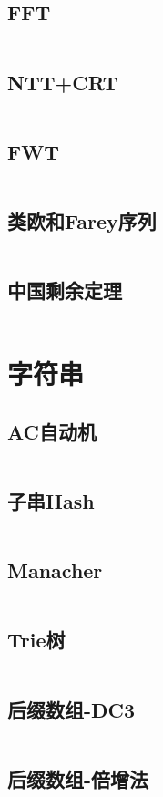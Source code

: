 \documentclass[UTF8]{ctexart}
\begin{document}
\subsection{FFT}
\inputminted{cpp}{math/FFT.cpp}
\subsection{NTT+CRT}
\inputminted{cpp}{math/NTT+CRT.cpp}
\subsection{FWT}
\inputminted{cpp}{math/FWT.cpp}
\subsection{类欧和Farey序列}
\inputminted{cpp}{math/类欧和Farey序列.cpp}
\subsection{中国剩余定理}
\inputminted{cpp}{math/中国剩余定理.cpp}
\section{字符串}
\subsection{AC自动机}
\inputminted{cpp}{string/AC自动机.cpp}
\subsection{子串Hash}
\inputminted{cpp}{string/Hash.cpp}
\subsection{Manacher}
\inputminted{cpp}{string/Manacher回文串.cpp}
\subsection{Trie树}
\inputminted{cpp}{string/Trie树.cpp}
\subsection{后缀数组-DC3}
\inputminted{cpp}{string/后缀数组-DC3.cpp}
\subsection{后缀数组-倍增法}
\inputminted{cpp}{string/后缀数组-倍增法.cpp}
\end{document}
